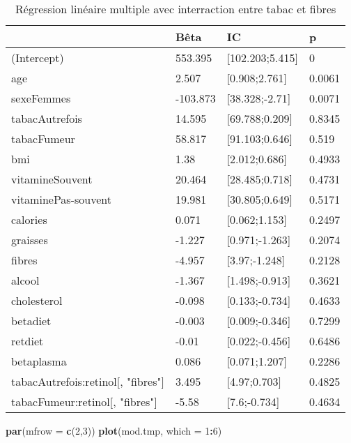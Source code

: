 \documentclass[]{article}
\newenvironment{Shaded}{\begin{snugshade}}{\end{snugshade}}
\newcommand{\KeywordTok}[1]{\textcolor[rgb]{0.13,0.29,0.53}{\textbf{#1}}}
\newcommand{\DataTypeTok}[1]{\textcolor[rgb]{0.13,0.29,0.53}{#1}}
\newcommand{\DecValTok}[1]{\textcolor[rgb]{0.00,0.00,0.81}{#1}}
\newcommand{\OperatorTok}[1]{\textcolor[rgb]{0.81,0.36,0.00}{\textbf{#1}}}
\newcommand{\NormalTok}[1]{#1}
\begin{document}
\begin{table}

\caption{\label{tab:unnamed-chunk-71}Régression linéaire multiple avec interraction entre tabac et fibres}
\centering
\begin{tabular}[t]{l|l|l|l}
\hline
  & Bêta & IC & p\\
\hline
\rowcolor[HTML]{BBD2E1}  (Intercept) & 553.395 & [102.203;5.415] & 0\\
\hline
age & 2.507 & [0.908;2.761] & 0.0061\\
\hline
\rowcolor[HTML]{BBD2E1}  sexeFemmes & -103.873 & [38.328;-2.71] & 0.0071\\
\hline
tabacAutrefois & 14.595 & [69.788;0.209] & 0.8345\\
\hline
\rowcolor[HTML]{BBD2E1}  tabacFumeur & 58.817 & [91.103;0.646] & 0.519\\
\hline
bmi & 1.38 & [2.012;0.686] & 0.4933\\
\hline
\rowcolor[HTML]{BBD2E1}  vitamineSouvent & 20.464 & [28.485;0.718] & 0.4731\\
\hline
vitaminePas-souvent & 19.981 & [30.805;0.649] & 0.5171\\
\hline
\rowcolor[HTML]{BBD2E1}  calories & 0.071 & [0.062;1.153] & 0.2497\\
\hline
graisses & -1.227 & [0.971;-1.263] & 0.2074\\
\hline
\rowcolor[HTML]{BBD2E1}  fibres & -4.957 & [3.97;-1.248] & 0.2128\\
\hline
alcool & -1.367 & [1.498;-0.913] & 0.3621\\
\hline
\rowcolor[HTML]{BBD2E1}  cholesterol & -0.098 & [0.133;-0.734] & 0.4633\\
\hline
betadiet & -0.003 & [0.009;-0.346] & 0.7299\\
\hline
\rowcolor[HTML]{BBD2E1}  retdiet & -0.01 & [0.022;-0.456] & 0.6486\\
\hline
betaplasma & 0.086 & [0.071;1.207] & 0.2286\\
\hline
\rowcolor[HTML]{BBD2E1}  tabacAutrefois:retinol[, "fibres"] & 3.495 & [4.97;0.703] & 0.4825\\
\hline
tabacFumeur:retinol[, "fibres"] & -5.58 & [7.6;-0.734] & 0.4634\\
\hline
\end{tabular}
\end{table}

\begin{Shaded}
\begin{Highlighting}[]
\KeywordTok{par}\NormalTok{(}\DataTypeTok{mfrow =} \KeywordTok{c}\NormalTok{(}\DecValTok{2}\NormalTok{,}\DecValTok{3}\NormalTok{))}
\KeywordTok{plot}\NormalTok{(mod.tmp, }\DataTypeTok{which =} \DecValTok{1}\OperatorTok{:}\DecValTok{6}\NormalTok{)}
\end{Highlighting}
\end{Shaded}
\end{document}
